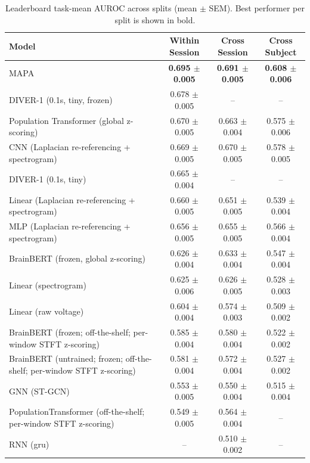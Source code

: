 \begin{table}[h]
\centering
\begin{tabular}{lccc}
\hline
Model & Within Session & Cross Session & Cross Subject \\
\hline
MAPA & \textbf{0.695 $\pm$ 0.005} & \textbf{0.691 $\pm$ 0.005} & \textbf{0.608 $\pm$ 0.006} \\
DIVER-1 (0.1s, tiny, frozen) & 0.678 $\pm$ 0.005 & -- & -- \\
Population Transformer (global z-scoring) & 0.670 $\pm$ 0.005 & 0.663 $\pm$ 0.004 & 0.575 $\pm$ 0.006 \\
CNN (Laplacian re-referencing + spectrogram) & 0.669 $\pm$ 0.005 & 0.670 $\pm$ 0.005 & 0.578 $\pm$ 0.005 \\
DIVER-1 (0.1s, tiny) & 0.665 $\pm$ 0.004 & -- & -- \\
Linear (Laplacian re-referencing + spectrogram) & 0.660 $\pm$ 0.005 & 0.651 $\pm$ 0.005 & 0.539 $\pm$ 0.004 \\
MLP (Laplacian re-referencing + spectrogram) & 0.656 $\pm$ 0.005 & 0.655 $\pm$ 0.005 & 0.566 $\pm$ 0.004 \\
BrainBERT (frozen, global z-scoring) & 0.626 $\pm$ 0.004 & 0.633 $\pm$ 0.004 & 0.547 $\pm$ 0.004 \\
Linear (spectrogram) & 0.625 $\pm$ 0.006 & 0.626 $\pm$ 0.005 & 0.528 $\pm$ 0.003 \\
Linear (raw voltage) & 0.604 $\pm$ 0.004 & 0.574 $\pm$ 0.003 & 0.509 $\pm$ 0.002 \\
BrainBERT (frozen; off-the-shelf; per-window STFT z-scoring) & 0.585 $\pm$ 0.004 & 0.580 $\pm$ 0.004 & 0.522 $\pm$ 0.002 \\
BrainBERT (untrained; frozen; off-the-shelf; per-window STFT z-scoring) & 0.581 $\pm$ 0.004 & 0.572 $\pm$ 0.004 & 0.527 $\pm$ 0.002 \\
GNN (ST-GCN) & 0.553 $\pm$ 0.005 & 0.550 $\pm$ 0.004 & 0.515 $\pm$ 0.004 \\
PopulationTransformer (off-the-shelf; per-window STFT z-scoring) & 0.549 $\pm$ 0.005 & 0.564 $\pm$ 0.004 & -- \\
RNN (gru) & -- & 0.510 $\pm$ 0.002 & -- \\
\hline
\end{tabular}
\caption{Leaderboard task-mean AUROC across splits (mean $\pm$ SEM). Best performer per split is shown in bold.}
\label{tab:leaderboard_overall_splits}
\end{table}